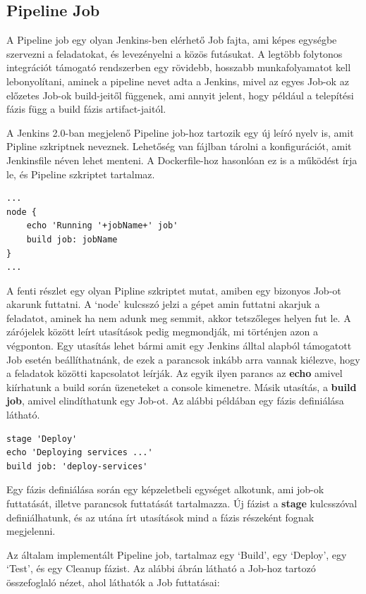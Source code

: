\documentclass[11pt,magyar,a4paper,twoside,]{report}
\begin{document}
\subsection{Pipeline Job}\label{pipeline-job}

A Pipeline job egy olyan Jenkins-ben elérhető Job fajta, ami képes
egységbe szervezni a feladatokat, és levezényelni a közös futásukat. A
legtöbb folytonos integrációt támogató rendszerben egy rövidebb,
hosszabb munkafolyamatot kell lebonyolítani, aminek a pipeline nevet
adta a Jenkins, mivel az egyes Job-ok az előzetes Job-ok build-jeitől
függenek, ami annyit jelent, hogy például a telepítési fázis függ a
build fázis artifact-jaitól.

A Jenkins 2.0-ban megjelenő Pipeline job-hoz tartozik egy új leíró nyelv
is, amit Pipline szkriptnek neveznek. Lehetőség van fájlban tárolni a
konfigurációt, amit Jenkinsfile néven lehet menteni. A Dockerfile-hoz
hasonlóan ez is a működést írja le, és Pipeline szkriptet tartalmaz.

\begin{verbatim}
...
node {
    echo 'Running '+jobName+' job'
    build job: jobName
}
...
\end{verbatim}

A fenti részlet egy olyan Pipline szkriptet mutat, amiben egy bizonyos
Job-ot akarunk futtatni. A `node' kulcsszó jelzi a gépet amin futtatni
akarjuk a feladatot, aminek ha nem adunk meg semmit, akkor tetszőleges
helyen fut le. A zárójelek között leírt utasítások pedig megmondják, mi
történjen azon a végponton. Egy utasítás lehet bármi amit egy Jenkins
álltal alapból támogatott Job esetén beállíthatnánk, de ezek a parancsok
inkább arra vannak kiélezve, hogy a feladatok közötti kapcsolatot
leírják. Az egyik ilyen parancs az \textbf{echo} amivel kiírhatunk a
build során üzeneteket a console kimenetre. Másik utasítás, a
\textbf{build job}, amivel elindíthatunk egy Job-ot. Az alábbi példában
egy fázis definiálása látható.

\begin{verbatim}
stage 'Deploy'
echo 'Deploying services ...'
build job: 'deploy-services'
\end{verbatim}

Egy fázis definiálása során egy képzeletbeli egységet alkotunk, ami
job-ok futtatását, illetve parancsok futtatását tartalmazza. Új fázist a
\textbf{stage} kulcsszóval definiálhatunk, és az utána írt utasítások
mind a fázis részeként fognak megjelenni.

Az általam implementált Pipeline job, tartalmaz egy `Build', egy
`Deploy', egy `Test', és egy Cleanup fázist. Az alábbi ábrán látható a
Job-hoz tartozó összefoglaló nézet, ahol láthatók a Job futtatásai:
\end{document}
